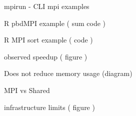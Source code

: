 \begin{frame}
		mpirun - CLI mpi examples
\end{frame}

\begin{frame}
		R pbdMPI example ( sum code )
\end{frame}

\begin{frame}
		R MPI sort example ( code )
\end{frame}

\begin{frame}
		observed speedup ( figure )
\end{frame}

\begin{frame}
		Does not reduce memory usage (diagram)
\end{frame}

\begin{frame}
		MPI vs Shared
\end{frame}

\begin{frame}
		infrastructure limits ( figure )
\end{frame}


